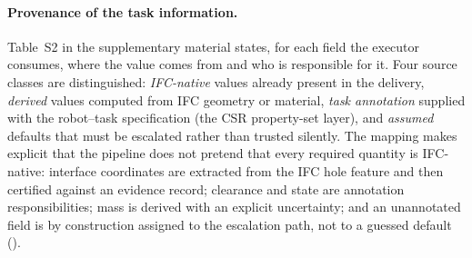\paragraph{Provenance of the task information.}
Table~S2 in the supplementary material states, for each field the executor
consumes, where
the value comes from and who is responsible for it. Four source classes are
distinguished: \emph{IFC-native} values already present in the delivery,
\emph{derived} values computed from IFC geometry or material, \emph{task
annotation} supplied with the robot--task specification (the CSR property-set
layer), and \emph{assumed} defaults that must be escalated rather than trusted
silently. The mapping makes explicit that the pipeline does not pretend that
every required quantity is IFC-native: interface coordinates are extracted
from the IFC hole feature and then certified against an evidence record;
clearance and state are annotation responsibilities; mass is derived with an
explicit uncertainty; and an unannotated field is by construction assigned to
the escalation path, not to a guessed default ().

